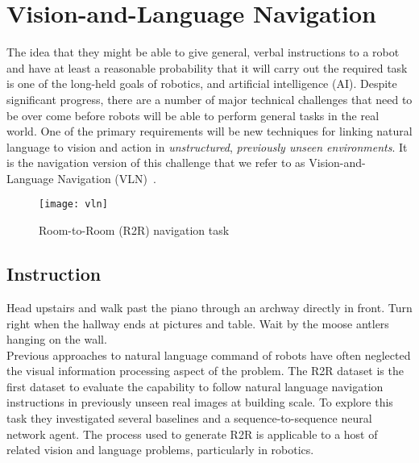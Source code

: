 \section{Vision-and-Language Navigation~\cite{DBLP:journals/corr/abs-1711-07280}}
The idea that they might be able to give general, verbal instructions to a robot and have at least a reasonable probability that it will carry out the required task is one of the long-held goals of robotics, and artificial intelligence (AI). 
Despite significant progress, there are a number of major technical challenges that need to be over come before robots will be able to perform general tasks in the real world. One of the primary requirements will be new techniques for linking natural language to vision and action in \emph{unstructured}, \emph{previously unseen environments}. It is the navigation version of this challenge that we refer to as Vision-and-Language Navigation (VLN)~\cite{DBLP:journals/corr/abs-1711-07280}.

\begin{figure}[htbp]
    \centering
    \texttt{[image: vln]}
    \caption{Room-to-Room (R2R) navigation task}
\end{figure}
\newpage
\subsection*{Instruction}
Head upstairs and walk past the piano through an archway directly in front. Turn right when the hallway ends at pictures and table. Wait by the moose antlers hanging on the wall.\\

Previous approaches to natural language command of robots have often neglected the visual information processing aspect of the problem. The R2R dataset is the first dataset to evaluate the capability to follow natural language navigation instructions in previously unseen real images at building scale. To explore this task they investigated several baselines and a sequence-to-sequence neural network agent.  The process used to generate R2R is applicable to a host of related vision and language problems, particularly in robotics. 
